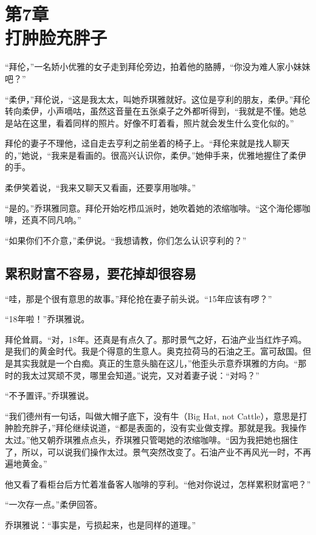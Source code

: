 \section[第7章\q 打肿脸充胖子]{第7章\\ 打肿脸充胖子}
\label{sec:ch7}

“拜伦，”一名娇小优雅的女子走到拜伦旁边，拍着他的胳膊，“你没为难人家小妹妹吧？”

“柔伊，”拜伦说，“这是我太太，叫她乔琪雅就好。这位是亨利的朋友，柔伊。”拜伦转向柔伊，小声嘀咕，虽然这音量在五张桌子之外都听得到，“我就是不懂。她总是站在这里，看着同样的照片。好像不盯着看，照片就会发生什么变化似的。”

拜伦的妻子不理他，迳自走去亨利之前坐着的椅子上。“拜伦来就是找人聊天的，”她说，“我来是看画的。很高兴认识你，柔伊。”她伸手来，优雅地握住了柔伊的手。

柔伊笑着说，“我来又聊天又看画，还要享用咖啡。”

“是的。”乔琪雅同意。拜伦开始吃栉瓜派时，她吹着她的浓缩咖啡。“这个海伦娜咖啡，还真不同凡响。”

“如果你们不介意，”柔伊说。“我想请教，你们怎么认识亨利的？”

\subsection{累积财富不容易，要花掉却很容易}

“哇，那是个很有意思的故事。”拜伦抢在妻子前头说。“15年应该有啰？”

“18年啦！”乔琪雅说。

拜伦耸肩。“对，18年。还真是有点久了。那时景气之好，石油产业当红炸子鸡。是我们的黄金时代。我是个得意的生意人。奥克拉荷马的石油之王。富可敌国。但是其实我就是一个白痴。真正的生意头脑在这儿，”他歪头示意乔琪雅的方向。“那时的我太过冥顽不灵，哪里会知道。”说完，又对着妻子说：“对吗？”

“不予置评。”乔琪雅说。

“我们德州有一句话，叫做大帽子底下，没有牛（Big Hat, not Cattle），意思是打肿脸充胖子，”拜伦继续说道，“都是表面的，没有实业做支撑。那就是我。我操作太过。”他又朝乔琪雅点点头，乔琪雅只管喝她的浓缩咖啡。“因为我把她也捆住了，所以，可以说我们操作太过。景气突然改变了。石油产业不再风光一时，不再遍地黄金。”

他又看了看柜台后方忙着准备客人咖啡的亨利。“他对你说过，怎样累积财富吧？”

“一次存一点。”柔伊回答。

乔琪雅说：“事实是，亏损起来，也是同样的道理。”

